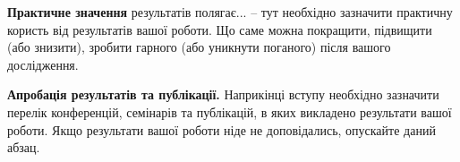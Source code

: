 \textbf{Практичне значення} результатів полягає... -- тут необхідно 
зазначити практичну користь від результатів вашої роботи. Що саме можна 
покращити, підвищити (або знизити), зробити гарного (або уникнути 
поганого) після вашого дослідження.

\textbf{Апробація результатів та публікації.} Наприкінці вступу необхідно 
зазначити перелік конференцій, семінарів та публікацій, в яких викладено 
результати вашої роботи. Якщо результати вашої роботи ніде не 
доповідались, опускайте даний абзац.
